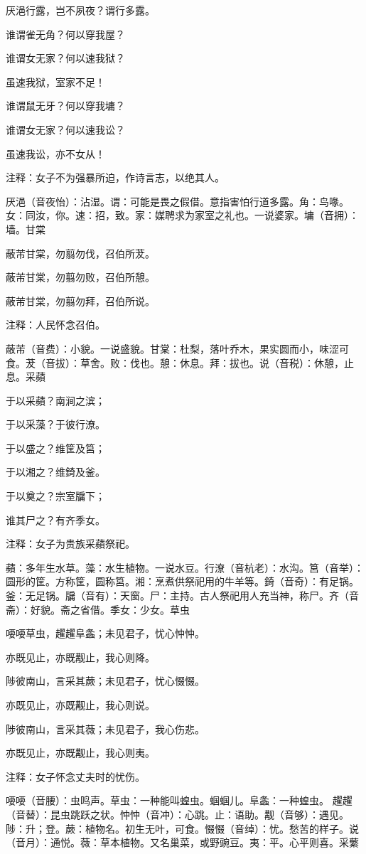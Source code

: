 \documentclass[12pt,UTF8]{ctexbook}
\begin{document}
厌浥行露，岂不夙夜？谓行多露。

谁谓雀无角？何以穿我屋？

谁谓女无家？何以速我狱？

虽速我狱，室家不足！

谁谓鼠无牙？何以穿我墉？

谁谓女无家？何以速我讼？

虽速我讼，亦不女从！

注释：女子不为强暴所迫，作诗言志，以绝其人。

厌浥（音夜怡）：沾湿。谓：可能是畏之假借。意指害怕行道多露。角：鸟喙。女：同汝，你。速：招，致。家：媒聘求为家室之礼也。一说婆家。墉（音拥）：墙。甘棠

蔽芾甘棠，勿翦勿伐，召伯所茇。

蔽芾甘棠，勿翦勿败，召伯所憩。

蔽芾甘棠，勿翦勿拜，召伯所说。

注释：人民怀念召伯。

蔽芾（音费）：小貌。一说盛貌。甘棠：杜梨，落叶乔木，果实圆而小，味涩可食。茇（音拔）：草舍。败：伐也。憩：休息。拜：拔也。说（音税）：休憩，止息。采蘋

于以采蘋？南涧之滨；

于以采藻？于彼行潦。

于以盛之？维筐及筥；

于以湘之？维錡及釜。

于以奠之？宗室牖下；

谁其尸之？有齐季女。

注释：女子为贵族采蘋祭祀。

蘋：多年生水草。藻：水生植物。一说水豆。行潦（音杭老）：水沟。筥（音举）：圆形的筐。方称筐，圆称筥。湘：烹煮供祭祀用的牛羊等。錡（音奇）：有足锅。釜：无足锅。牖（音有）：天窗。尸：主持。古人祭祀用人充当神，称尸。齐（音斋）：好貌。斋之省借。季女：少女。草虫

喓喓草虫，趯趯阜螽；未见君子，忧心忡忡。

亦既见止，亦既觏止，我心则降。

陟彼南山，言采其蕨；未见君子，忧心惙惙。

亦既见止，亦既觏止，我心则说。

陟彼南山，言采其薇；未见君子，我心伤悲。

亦既见止，亦既觏止，我心则夷。

注释：女子怀念丈夫时的忧伤。

喓喓（音腰）：虫鸣声。草虫：一种能叫蝗虫。蝈蝈儿。阜螽：一种蝗虫。 趯趯（音替）：昆虫跳跃之状。忡忡（音冲）：心跳。止：语助。觏（音够）：遇见。陟：升；登。蕨：植物名。初生无叶，可食。惙惙（音绰）：忧。愁苦的样子。说（音月）：通悦。薇：草本植物。又名巢菜，或野豌豆。夷：平。心平则喜。采蘩
\end{document}
